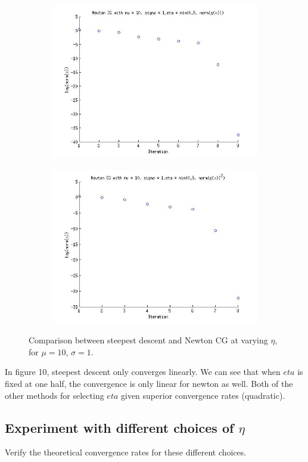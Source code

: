 \documentclass{article}
\begin{document}
\begin{figure}[!htb]
\begin{subfigure}[bh]{0.45\textwidth}
                \includegraphics[width=\textwidth]{figs/P3NCGmu10sig1eta2.jpg}
        \end{subfigure}%
        \begin{subfigure}[bh]{0.45\textwidth}
                \includegraphics[width=\textwidth]{figs/P3NCGmu10sig1eta3.jpg}
        \end{subfigure}
        \caption{Comparison between steepest descent and Newton CG at
 varying $\eta$, for $\mu=10$, $\sigma=1$.}
\end{figure}
In figure 10, steepest descent only converges linearly. We can see that
when $eta$ is fixed at one half, the convergence is only linear for
newton as well. Both of the other methods for selecting $eta$ given
superior convergence rates (quadratic). 

\subsection{Experiment with different choices of $\eta$}

Verify the theoretical convergence rates for these different choices. 
\end{document}
